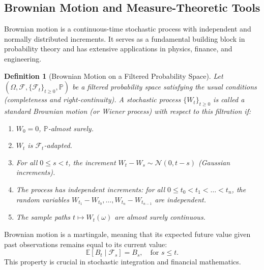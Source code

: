\documentclass[11pt, twoside]{report}
\newtheorem{definition}[theorem]{Definition}
\begin{document}



\subsection{Brownian Motion and Measure-Theoretic Tools}
Brownian motion is a continuous-time stochastic process with independent and normally distributed increments. It serves as a fundamental building block in probability theory and has extensive applications in physics, finance, and engineering.

\begin{definition}[Brownian Motion on a Filtered Probability Space]
Let $(\Omega, \mathcal{F}, \{\mathcal{F}_t\}_{t \geq 0}, \mathbb{P})$ be a filtered probability space satisfying the usual conditions (completeness and right-continuity). A stochastic process $\{W_t\}_{t \geq 0}$ is called a \emph{standard Brownian motion} (or \emph{Wiener process}) with respect to this filtration if:

\begin{enumerate}
    \item $W_0 = 0$, $\mathbb{P}$-almost surely.
    \item $W_t$ is $\mathcal{F}_t$-adapted.
    \item For all $0 \leq s < t$, the increment $W_t - W_s \sim \mathcal{N}(0, t-s)$ (Gaussian increments).
    \item The process has independent increments: for all $0 \le t_0 < t_1 < \dots < t_n$, the random variables $W_{t_1} - W_{t_0}, \dots, W_{t_n} - W_{t_{n-1}}$ are independent.
    \item The sample paths $t \mapsto W_t(\omega)$ are almost surely continuous.
\end{enumerate}
\end{definition}

Brownian motion is a martingale, meaning that its expected future value given past observations remains equal to its current value:
\begin{equation}
    \mathbb{E}[B_t \mid \mathcal{F}_s] = B_s, \quad \text{for } s \leq t.
\end{equation}
This property is crucial in stochastic integration and financial mathematics.
\end{document}
